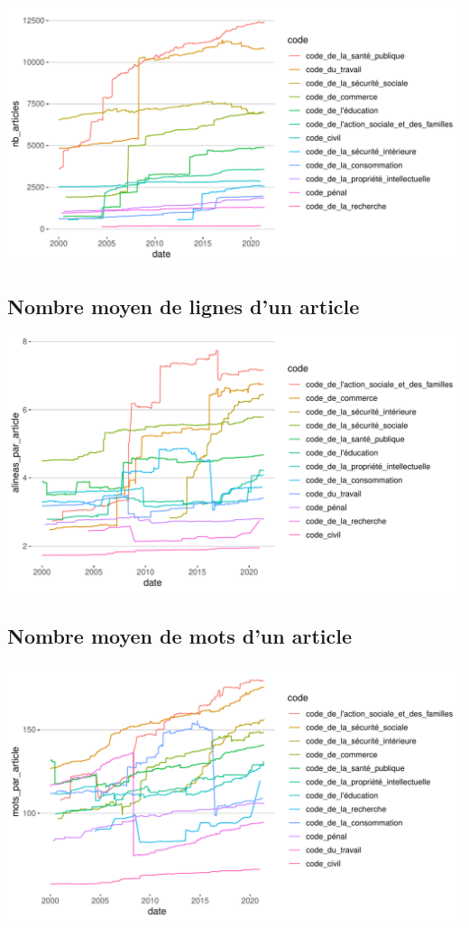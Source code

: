 \documentclass[
  oneside]{book}
\begin{document}
\includegraphics{05-images_files/figure-latex/nb_articles-1.pdf}

\hypertarget{nombre-moyen-de-lignes-dun-article}{%
\subsection{Nombre moyen de lignes d'un article}\label{nombre-moyen-de-lignes-dun-article}}

\includegraphics{05-images_files/figure-latex/alineas_par_article-1.pdf}

\hypertarget{nombre-moyen-de-mots-dun-article}{%
\subsection{Nombre moyen de mots d'un article}\label{nombre-moyen-de-mots-dun-article}}

\includegraphics{05-images_files/figure-latex/mots_par_article-1.pdf}
\end{document}
